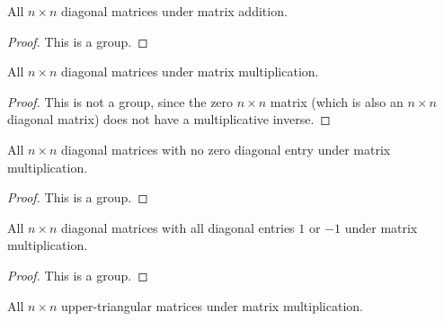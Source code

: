 \begin{exercise}
    All $n\times n$ diagonal matrices under matrix addition.
\end{exercise}

\begin{proof}
    This is a group.
\end{proof}

\begin{exercise}
    All $n\times n$ diagonal matrices under matrix multiplication.
\end{exercise}

\begin{proof}
    This is not a group, since the zero $n\times n$ matrix (which is also an $n\times n$ diagonal matrix) does not have a multiplicative inverse.
\end{proof}

\begin{exercise}
    All $n\times n$ diagonal matrices with no zero diagonal entry under matrix multiplication.
\end{exercise}

\begin{proof}
    This is a group.
\end{proof}

\begin{exercise}
    All $n\times n$ diagonal matrices with all diagonal entries $1$ or $-1$ under matrix multiplication.
\end{exercise}

\begin{proof}
    This is a group.
\end{proof}

\begin{exercise}
    All $n\times n$ upper-triangular matrices under matrix multiplication.
\end{exercise}

